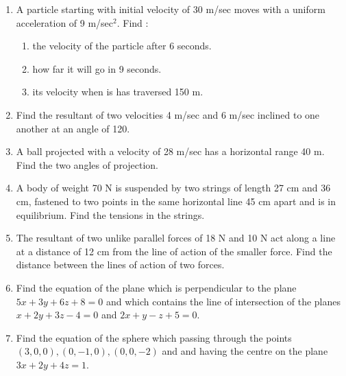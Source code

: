 \documentclass[journal,12pt,twocolumn]{IEEEtran}
\begin{document}
\begin{enumerate}
\item  A particle starting with initial velocity of 30 m/sec moves with a uniform acceleration of 9 m/sec$^2$. Find :
\begin{enumerate}
   \item the velocity of the particle after 6 seconds.
   \item how far it will go in 9 seconds.
   \item its velocity when is has traversed 150 m.
\end{enumerate}
\item Find the resultant of two velocities 4 m/sec and 6 m/sec inclined to one another at an angle of 120\degree.
\item A ball projected with a velocity of 28 m/sec has a horizontal range 40 m. Find the two angles of projection.
\item A body of weight 70 N is suspended by two strings of length 27 cm and 36 cm, fastened to two points in the same horizontal line 45 cm apart and is in equilibrium. Find the tensions in the strings.
\item The resultant of two unlike parallel forces of 18 N and 10 N act along a line at a distance of 12 cm from the line of action of the smaller force. Find the distance between the lines of action of two forces.
\item Find the equation of the plane which is perpendicular to the plane $5x + 3y + 6 z + 8 = 0$ and which contains the line of intersection of the planes $x + 2y + 3z - 4 = 0 $ and $2x + y - z + 5 = 0$.
\item Find the equation of the sphere which passing through the points $ (3, 0, 0), (0, -1, 0), (0, 0, -2)$ and and having the centre on the plane $3x + 2y + 4z = 1$.

\end{enumerate}
\end{document}
